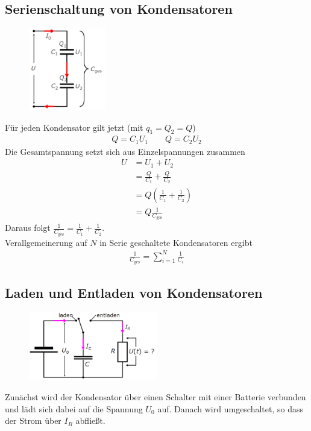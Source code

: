 \documentclass{scrartcl}
\begin{document}
\subsection{Serienschaltung von Kondensatoren}
\begin{figure}[H]
    \centering
    \includegraphics[width=0.3\textwidth]{Serienschaltung von Kondensatoren.png}
\end{figure}
Für jeden Kondensator gilt jetzt (mit $q_1=Q_2=Q$)
\begin{align}
    Q=C_1U_1\qquad Q=C_2U_2
\end{align}
Die Gesamtspannung setzt sich aus Einzelspannungen zusammen 
\begin{align}
    U&=U_1+U_2\\
    &=\frac{Q}{C_1}+\frac{Q}{C_2}\\
    &=Q\left(\frac{1}{C_1}+\frac{1}{C_2}\right)\\
    &=Q\frac{1}{C_\text{ges}}
\end{align}
Daraus folgt $\frac{1}{C_\text{ges}}=\frac{1}{C_1}+\frac{1}{C_2}$.\\
Verallgemeinerung auf $N$ in Serie geschaltete Kondensatoren ergibt
\begin{align}
    \frac{1}{C_\text{ges}}=\sum_{i=1}^{N}\frac{1}{C_i}
\end{align}

\subsection{Laden und Entladen von Kondensatoren}
\begin{figure}[H]
    \centering
    \includegraphics[width=0.5\textwidth]{Laden und entladen von Kondensatoren.png}
\end{figure}
Zunächst wird der Kondensator über einen Schalter mit einer Batterie verbunden
und lädt sich dabei auf die Spannung $U_0$ auf. Danach wird umgeschaltet,
so dass der Strom über $I_R$ abfließt.\\
\end{document}
